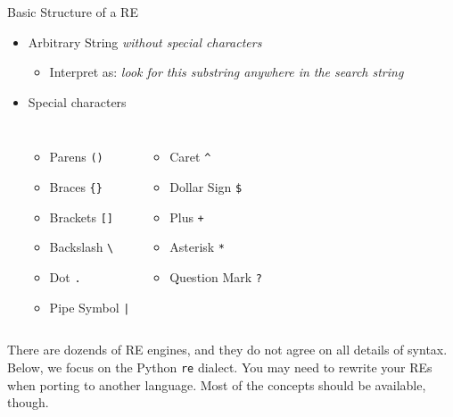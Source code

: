 
\begin{frame}{Basic Structure of a RE}
%
\begin{itemize}
\item Arbitrary String \emph{without special characters}
	\begin{itemize}
	\item Interpret as: \emph{look for this substring anywhere in the search string}
	\end{itemize}
\item Special characters
	\vspace{-9pt}
	\begin{columns}[T]
	\begin{itemize}
	\setlength\itemsep{-2pt}
	\item Parens \texttt{()}
	\item Braces \texttt{\{\}}
	\item Brackets \texttt{[]}
	\item Backslash \texttt{\textbackslash}
	\item Dot \texttt{.}
	\item Pipe Symbol \texttt{|}
	\end{itemize}
	\begin{itemize}
	\setlength\itemsep{-2pt}
	\item Caret \texttt{\textasciicircum}
	\item Dollar Sign \texttt{\$}
	\item Plus \texttt{+}
	\item Asterisk \texttt{*}
	\item Question Mark \texttt{?}
	\end{itemize}
	\end{columns}
\end{itemize}
%
\begin{hintbox}
\footnotesize
There are dozends of RE engines, and they do not agree on all details of syntax.\\
Below, we focus on the Python \texttt{re} dialect. You may need to rewrite your REs when porting to another language.
Most of the concepts should be available, though.
\end{hintbox}
%
\end{frame}


